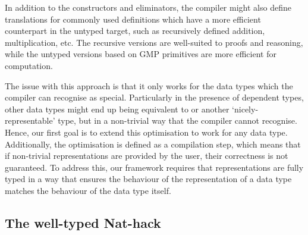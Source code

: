 In addition to the constructors and eliminators, the compiler might also define
translations for commonly used definitions which have a more efficient
counterpart in the untyped target, such as recursively defined addition,
multiplication, etc. The recursive versions are well-suited to proofs and
reasoning, while the untyped versions based on GMP primitives are more efficient
for computation.

The issue with this approach is that it only works for the data types which the
compiler can recognise as special. Particularly in the presence of dependent
types, other data types might end up being equivalent to  or
another `nicely-representable' type, but in a non-trivial way that the compiler
cannot recognise. Hence, our first goal is to extend this optimisation to work
for any data type. Additionally, the optimisation is defined as a compilation
step, which means that if non-trivial representations are provided by the user,
their correctness is not guaranteed. To address this, our framework requires
that representations are fully typed in a way that ensures the behaviour of the
representation of a data type matches the behaviour of the data type itself.

\subsection{The well-typed Nat-hack}

